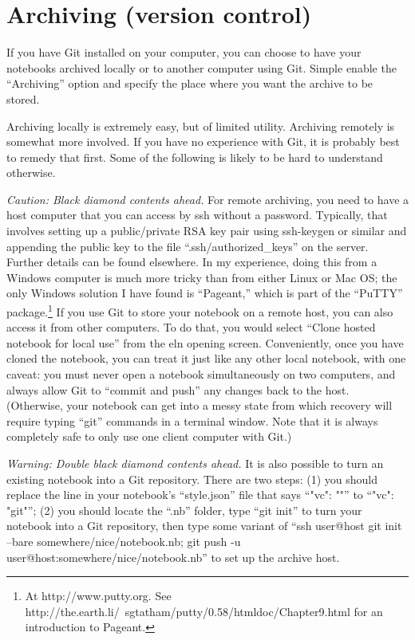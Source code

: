 \documentclass[11pt]{report}
\begin{document}
\section{Archiving (version control)}

If you have Git installed on your computer, you can choose to have
your notebooks archived locally or to another computer using
Git. Simple enable the ``Archiving'' option and specify the place
where you want the archive to be stored.

Archiving locally is extremely easy, but of limited utility. Archiving
remotely is somewhat more involved. If you have no experience with
Git, it is probably best to remedy that first. Some of the following
is likely to be hard to understand otherwise.

\emph{Caution: Black diamond contents ahead.} For remote archiving,
you need to have a host computer that you can access by ssh
without a password. Typically, that involves setting up a
public/private RSA key pair using ssh-keygen or similar and appending
the public key to the file ``.ssh/authorized\_keys'' on the
server. Further details can be found elsewhere. In my experience,
doing this from a Windows computer is much more tricky than from
either Linux or Mac OS; the only Windows solution I have found is
``Pageant,'' which is part of the ``PuTTY'' package.\footnote{At
http://www.putty.org. See
http://the.earth.li/~sgtatham/putty/0.58/htmldoc/Chapter9.html for an
introduction to Pageant.} If you use Git to store your notebook on a
remote host, you can also access it from other computers. To do that,
you would select ``Clone hosted notebook for local use'' from the eln
opening screen. Conveniently, once you have cloned the notebook, you
can treat it just like any other local notebook, with one caveat: you
must never open a notebook simultaneously on two computers, and always
allow Git to ``commit and push'' any changes back to the
host. (Otherwise, your notebook can get into a messy state from which
recovery will require typing ``git'' commands in a terminal
window. Note that it is always completely safe to only use one client
computer with Git.)

\emph{Warning: Double black diamond contents ahead.} It is also
possible to turn an existing notebook into a Git repository. There are
two steps: (1) you should replace the line in your notebook's
``style.json'' file that says ``"vc": ""'' to ``"vc": "git"''; (2) you
should locate the ``.nb'' folder, type ``git init'' to turn your
notebook into a Git repository, then type some variant of ``ssh
user@host git init --bare somewhere/nice/notebook.nb; git push -u
user@host:somewhere/nice/notebook.nb'' to set up the archive host.
\end{document}
